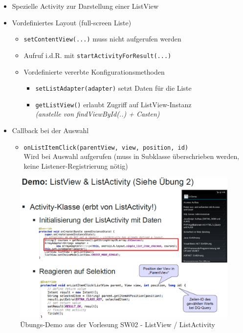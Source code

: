 \documentclass[a4paper]{article}
\begin{document}
\begin{itemize}
	\item Spezielle Activity zur Darstellung einer ListView
	\item Vordefiniertes Layout (full-screen Liste)
		\begin{itemize}
			\item \texttt{setContentView(...)} muss nicht aufgerufen werden
			\item Aufruf i.d.R. mit \texttt{startActivityForResult(...)}
			\item Vordefinierte vererbte Konfigurationsmethoden
				\begin{itemize}
					\item \texttt{setListAdapter(adapter)} setzt Daten für die Liste
					\item \texttt{getListView()} erlaubt Zugriff auf ListView-Instanz\\
					\textit{(anstelle von findViewById(..) + Casten)}
				\end{itemize}
		\end{itemize}
	\item Callback bei der Auswahl
		\begin{itemize}
			\item \texttt{onListItemClick(parentView, view, position, id)}\\
			Wird bei Auswahl aufgerufen (muss in Subklasse überschrieben werden, keine Listener-Registrierung nötig)
		\end{itemize}
\end{itemize}

\begin{figure}[htb!]
	\centering
	\includegraphics[width=.8\linewidth]{img/listview_demo.png}
	\caption{Übungs-Demo aus der Vorlesung SW02 - ListView / ListActivity}
\end{figure}
\end{document}
